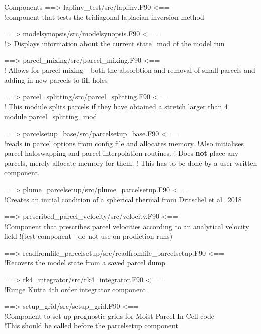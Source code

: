 \documentclass{beamer}
\begin{document}
\begin{frame}{Components}
==\textgreater{} laplinv\_test/src/laplinv.F90 \textless{}==\\
!component that tests the tridiagonal laplacian inversion method

==\textgreater{} modelsynopsis/src/modelsynopsis.F90 \textless{}==\\
!\textgreater{} Displays information about the current state\_mod of the
model run

==\textgreater{} parcel\_mixing/src/parcel\_mixing.F90 \textless{}==\\
! Allows for parcel mixing - both the absorbtion and removal of small
parcels and adding in new parcels to fill holes

==\textgreater{} parcel\_splitting/src/parcel\_splitting.F90
\textless{}==\\
! This module splits parcels if they have obtained a stretch larger than
4\\
module parcel\_splitting\_mod

==\textgreater{} parcelsetup\_base/src/parcelsetup\_base.F90
\textless{}==\\
!reads in parcel options from config file and allocates memory. !Also
initialises parcel haloswapping and parcel interpolation routines. !
Does \textbf{not} place any parcels, merely allocate memory for them. !
This has to be done by a user-written component.

==\textgreater{} plume\_parcelsetup/src/plume\_parcelsetup.F90
\textless{}==\\
!Creates an initial condition of a spherical thermal from Dritschel et
al.~2018

==\textgreater{} prescribed\_parcel\_velocity/src/velocity.F90
\textless{}==\\
!Component that prescribes parcel velocities according to an analytical
velocity field !(test component - do not use on prodiction runs)

==\textgreater{}
readfromfile\_parcelsetup/src/readfromfile\_parcelsetup.F90
\textless{}==\\
!Recovers the model state from a saved parcel dump

==\textgreater{} rk4\_integrator/src/rk4\_integrator.F90 \textless{}==\\
!Runge Kutta 4th order integrator component

==\textgreater{} setup\_grid/src/setup\_grid.F90 \textless{}==\\
!Component to set up prognostic grids for Moist Parcel In Cell code\\
!This should be called before the parcelsetup component


\end{frame}
\end{document}
